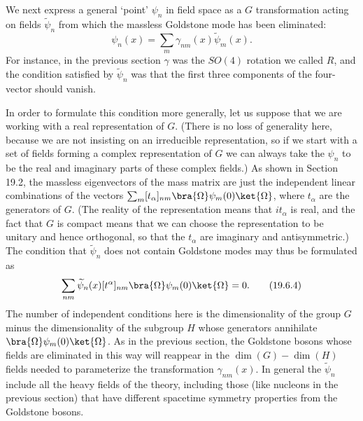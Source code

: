 We next express a general `point' $\psi_n$ in field space as a $G$ transformation acting on fields $\widetilde\psi_n$ from which the massless Goldstone mode has been eliminated:
\begin{equation}
\psi_n(x)=\sum_m\gamma_{nm}(x)\widetilde\psi_m(x).
\tag{19.6.3}\label{eq:19.6.3}
\end{equation}
For instance, in the previous section $\gamma$ was the $SO(4)$ rotation we called $R$, and the condition satisfied by $\widetilde\psi_n$ was that the first three components of the four-vector should vanish.

In order to formulate this condition more generally, let us suppose that we are working with a real representation of $G$. (There is no loss of generality here, because we are not insisting on an irreducible representation, so if we start with a set of fields forming a complex representation of $G$ we can always take the $\psi_n$ to be the real and imaginary parts of these complex fields.) As shown in Section 19.2, the massless eigenvectors of the mass matrix are just the independent linear combinations of the vectors $\sum_m[t_\alpha]_{nm}\bra{\Omega}\psi_m(0)\ket{\Omega}$, where $t_\alpha$ are the generators of $G$. (The reality of the representation means that $it_\alpha$ is real, and the fact that $G$ is compact means that we can choose the representation to be unitary and hence orthogonal, so that the $t_\alpha$ are imaginary and antisymmetric.) The condition that $\widetilde\psi_n$ does not contain Goldstone modes may thus be formulated as
\begin{equation}
\sum_{nm}\widetilde\psi_n(x)[t^\alpha]_{nm}
\bra{\Omega}\psi_m(0)\ket{\Omega}=0.
\tag{19.6.4}\label{eq:19.6.4}
\end{equation}
The number of independent conditions here is the dimensionality of the group $G$ minus the dimensionality of the subgroup $H$ whose generators annihilate $\bra{\Omega}\psi_m(0)\ket{\Omega}$. As in the previous section, the Goldstone bosons whose fields are eliminated in this way will reappear in the $\dim(G)-\dim(H)$ fields needed to parameterize the transformation $\gamma_{nm}(x)$. In general the $\widetilde\psi_n$ include all the heavy fields of the theory, including those (like nucleons in the previous section) that have different spacetime symmetry properties from the Goldstone bosons.

